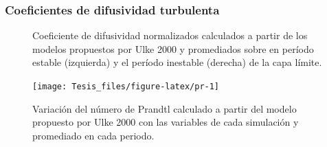 \documentclass[12pt,spanish,oneside]{book}
\begin{document}
\subsubsection{Coeficientes de difusividad
turbulenta}\label{coeficientes-de-difusividad-turbulenta-1}

\begin{figure}

{\centering {}\newline{}

}

\caption{Coeficiente de difusividad normalizados calculados a partir de los modelos propuestos por Ulke 2000 y promediados sobre en período estable (izquierda) y el período inestable (derecha) de la capa límite. \label{kh-ulke}}\label{fig:k_norm}
\end{figure}

\begin{figure}

{\centering \texttt{[image: Tesis\_files/figure-latex/pr-1]} 

}

\caption{Variación del número de Prandtl calculado a partir del modelo propuesto por Ulke 2000 con las variables de cada simulación y promediado en cada periodo. \label{Pr}}\label{fig:pr}
\end{figure}
\end{document}
